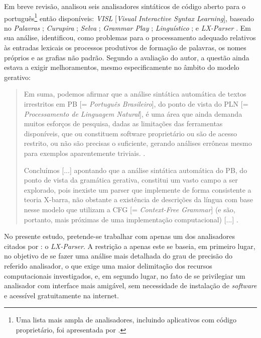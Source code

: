 \documentclass[portuguese]{textolivre}
\begin{document}
Em breve revisão, \textcite{alencar_utilizacao_2011} analisou seis analisadores sintáticos de código aberto para o português\footnote{Uma lista mais ampla de analisadores, incluindo aplicativos com código proprietário, foi apresentada por \textcite{menuzzi_sintaxe_2008}.} então disponíveis: \textit{VISL} [\textit{Visual Interactive Syntax Learning}], baseado no \textit{Palavras} \cite{bick_parsing_2000}; \textit{Curupira} \cite{martins_curupira:_2003}; \textit{Selva} \cite{almeida_selva:_2003}; \textit{Grammar Play} \cite{othero_grammar_2004}; \textit{Linguístico} \cite{contier_tecnologia_2010}; e \textit{LX-Parser} \cite{silva_out-box_2010}. Em sua análise, \textcite{alencar_utilizacao_2011} identificou, como problemas para o processamento adequado relativos às entradas lexicais os processos produtivos de formação de palavras, os nomes próprios e as grafias não padrão. Segundo a avaliação do autor, a questão ainda estava a exigir melhoramentos, mesmo especificamente no âmbito do modelo gerativo:

\begin{quote}
    Em suma, podemos afirmar que a análise sintática automática de textos irrestritos em PB [= \textit{Português Brasileiro}], do ponto de vista do PLN [= \textit{Processamento de Linguagem Natural}], é uma área que ainda demanda muitos esforços de pesquisa, dadas as limitações das ferramentas disponíveis, que ou constituem software proprietário ou são de acesso restrito, ou não são precisas o suficiente, gerando análises errôneas mesmo para exemplos aparentemente triviais. \cite[p.~30]{alencar_utilizacao_2011}. 
    
    Concluímos [...] apontando que a análise sintática automática do PB, do ponto de vista da gramática gerativa, constitui um vasto campo a ser explorado, pois inexiste um parser que implemente de forma consistente a teoria X-barra, não obstante a existência de descrições da língua com base nesse modelo que utilizam a CFG [= \textit{Context-Free Grammar}] (e são, portanto, mais próximas de uma implementação computacional) [...] \cite[p.~32]{alencar_utilizacao_2011}.
\end{quote}

No presente estudo, pretende-se trabalhar com apenas um dos analisadores citados por \textcite{alencar_utilizacao_2011}: o \textit{LX-Parser}. A restrição a apenas este se baseia, em primeiro lugar, no objetivo de se fazer uma análise mais detalhada do grau de precisão do referido analisador, o que exige uma maior delimitação dos recursos computacionais investigados, e, em segundo lugar, no fato de se privilegiar um analisador com interface mais amigável, sem necessidade de instalação de \textit{software} e acessível gratuitamente na internet.
\end{document}
